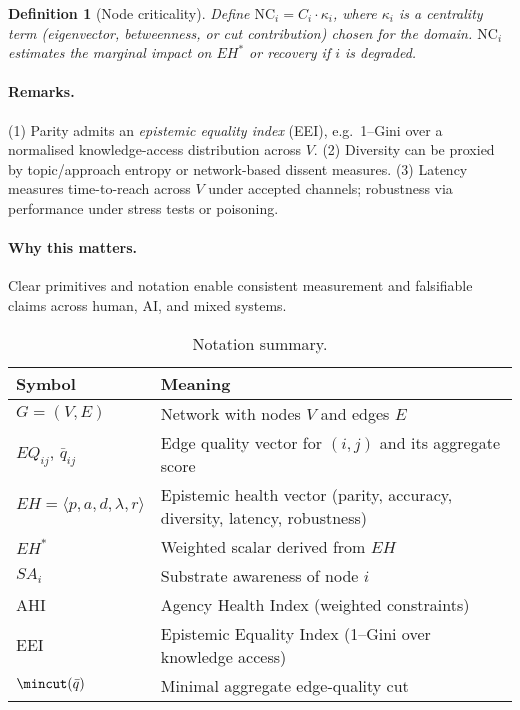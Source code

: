 \documentclass[12pt]{article}
\newtheorem{definition}{Definition}
\begin{document}
\begin{definition}[Node criticality]\label{def:criticality}
Define $\mathrm{NC}_i=C_i \cdot \kappa_i$, where $\kappa_i$ is a centrality term (eigenvector, betweenness, or cut contribution) chosen for the domain. $\mathrm{NC}_i$ estimates the marginal impact on $EH^{\ast}$ or recovery if $i$ is degraded.
\end{definition}


\paragraph{Remarks.}
(1) Parity admits an \emph{epistemic equality index} (EEI), e.g.\ 1--Gini over a normalised knowledge-access distribution across $V$. 
(2) Diversity can be proxied by topic/approach entropy or network-based dissent measures. 
(3) Latency measures time-to-reach across $V$ under accepted channels; robustness via performance under stress tests or poisoning.

\paragraph{Why this matters.} Clear primitives and notation enable consistent measurement and falsifiable claims across human, AI, and mixed systems.

\begin{table}[htbp]
\centering
\small
\caption{Notation summary.}
\label{tab:notation}
\begin{tabularx}{\linewidth}{lY}
\toprule
\textbf{Symbol} & \textbf{Meaning} \\
\midrule
$G=(V,E)$ & Network with nodes $V$ and edges $E$ \\
$EQ_{ij}$, $\bar q_{ij}$ & Edge quality vector for $(i,j)$ and its aggregate score \\
$EH=\langle p,a,d,\lambda,r\rangle$ & Epistemic health vector (parity, accuracy, diversity, latency, robustness) \\
$EH^{\ast}$ & Weighted scalar derived from $EH$ \\
$SA_i$ & Substrate awareness of node $i$ \\
AHI & Agency Health Index (weighted constraints) \\
EEI & Epistemic Equality Index (1--Gini over knowledge access) \\
$\mincut(\bar q)$ & Minimal aggregate edge-quality cut \\
\bottomrule
\end{tabularx}
\end{table}
\end{document}
